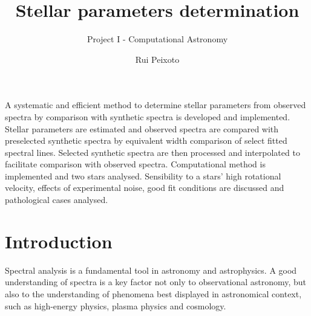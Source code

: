 \documentclass{aa}
\begin{document}
 


   \title{Stellar parameters determination}

   \subtitle{Project I - Computational Astronomy}

   \author{Rui Peixoto}



 
  \abstract
   {}
   {A systematic and efficient method to determine stellar parameters from observed spectra by
     comparison with synthetic spectra is developed and implemented.}
   {Stellar parameters are estimated and observed spectra are compared with
     preselected synthetic spectra by equivalent width comparison of select fitted
     spectral lines. Selected synthetic spectra are then processed and
     interpolated to facilitate comparison with observed spectra.}
   {Computational method is implemented and two stars analysed. Sensibility to a
     stars' high rotational velocity, effects of experimental noise, good fit
     conditions are discussed and pathological cases analysed.}
   {}


   \maketitle
%

\section{Introduction}

Spectral analysis is a fundamental tool in astronomy and
astrophysics. A good understanding of spectra is a key factor not only to
observational astronomy, but also to the understanding of phenomena best
displayed in astronomical context, such as high-energy physics, plasma physics and cosmology.
\end{document}
